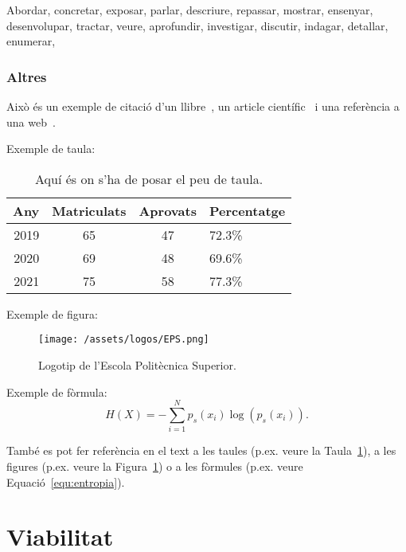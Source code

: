\documentclass[a4paper,12pt]{ThesisStyle}
\begin{document}
Abordar, concretar, exposar, parlar, descriure, repassar, mostrar, ensenyar, desenvolupar, tractar, veure, aprofundir, investigar, discutir, indagar, detallar,
enumerar,


\subsection{Altres}

Això és un exemple de citació d'un llibre~\cite{Coleman1974}, un article científic~\cite{Ruiz2008} i una referència a una web~\cite{Halcon}.

Exemple de taula:
\begin{table}[htb]
\centering
\begin{tabular}{ | r | c | c | l | }
 \hline
  Any & Matriculats & Aprovats & Percentatge\\
\hline
 2019  & 65 & 47 & 72.3\%\\
 2020  & 69 & 48 & 69.6\%\\
 2021  & 75 & 58 & 77.3\%\\
  \hline
  \end{tabular}
\caption{\label{taula:taulaexemple} Aquí és on s'ha de posar el peu de taula. }
\end{table}

Exemple de figura:
\begin{figure}[htb]
\centering
\texttt{[image: /assets/logos/EPS.png]}
\caption{\label{fig:logo} Logotip de l'Escola Politècnica Superior.}
\end{figure}

Exemple de fòrmula:
\begin{equation}
H(X) = -\sum_{i=1}^{N}p_s(x_i) \log \left( p_s(x_i) \right).
\label{equ:entropia}
\end{equation}


També es pot fer referència en el text a les taules (p.ex. veure la Taula~\ref{taula:taulaexemple}), a les figures (p.ex. veure la Figura~\ref{fig:logo}) o a les fòrmules (p.ex. veure Equació~\ref{equ:entropia}).



\chapter{Viabilitat}
\label{cap:viabilitat}
\end{document}
